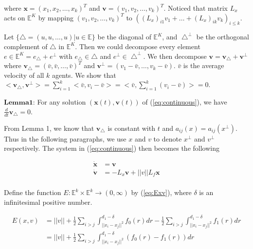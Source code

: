 \noindent
where $\mathbf{x}=(x_1, x_2, \dots, x_k)^T$ and $\mathbf{v}=(v_1, v_2, \dots, v_k)^T$. Noticed that matrix $L_x$ acts on $\mathbb{E}^K$ by mapping $(v_1, v_2, \dots, v_k)^T$ to $((L_x)_{i1}v_1+\dots+(L_x)_{ik}v_k)_{i\leq k}$.

Let $\{\bigtriangleup={(u, u, \dots, u)|u\in\mathbb{E}}\}$ be the diagonal of $\mathbb{E}^K$, and $\bigtriangleup^{\perp}$ be the orthogonal complement of $\bigtriangleup$ in $\mathbb{E}^K$. Then we could decompose every element $e\in\mathbb{E}^K=e_{\bigtriangleup}+e^{\perp}$ with $e_{\bigtriangleup}\in\bigtriangleup$ and $e^{\perp}\in\bigtriangleup^{\perp}$. We then decompose $\mathbf{v}=\mathbf{v_{\bigtriangleup}+v^{\perp}}$ where $\mathbf{v_{\bigtriangleup}}=(\bar{v}, \bar{v}, \dots, \bar{v})^T$ and $\mathbf{v^{\perp}}=(v_1-\bar{v}, \dots, v_k-\bar{v})$. $\bar{v}$ is the average velocity of all $k$ agents. We show that $<\mathbf{v_{\bigtriangleup}}, \mathbf{v^{\perp}}>=\sum_{i=1}^k<\bar{v},v_i-\bar{v}>=<\bar{v},\sum_{i=1}^k(v_i-\bar{v})>=0$.

$\mathbf{Lemma 1}$: For any solution $(\mathbf{x}(t), \mathbf{v}(t))$ of (\ref{eq:continuous}), we have $\frac{d}{dt}\mathbf{v}_{\bigtriangleup}=0$.

From Lemma 1, we know that $\mathbf{v_{\bigtriangleup}}$ is constant with $t$ and $a_{ij}(x)=a_{ij}(x^{\perp})$. Thus in the following paragraphs, we use $x$ and $v$ to denote $x^{\perp}$ and $v^{\perp}$ respectively. The system in (\ref{eq:continuous}) then becomes the following

\begin{equation}\label{eq:continuous_projection}
\begin{aligned}
\mathbf{\dot{x}}&=\mathbf{v}\\
\mathbf{\dot{v}}&=-L_x\mathbf{v}+||v||L_f\mathbf{x}\\
\end{aligned}
\end{equation}

Define the function $E: \mathbb{E}^k\times\mathbb{E}^k\to(0,\infty)$ by (\ref{eq:Exv}), where $\delta$ is an infinitesimal positive number.

\begin{equation}\label{eq:Exv}
\begin{aligned}
E(x, v)&=||v||+\frac{1}{2}\sum_{i>j}\int_{||x_i-x_j||^2}^{d_1-\delta}f_0(r)dr-\frac{1}{2}\sum_{i>j}\int_{||x_i-x_j||^2}^{d_1-\delta}f_1(r)dr\\
&=||v||+\frac{1}{2}\sum_{i>j}\int_{||x_i-x_j||^2}^{d_1-\delta}(f_0(r)-f_1(r))dr
\end{aligned}
\end{equation}

